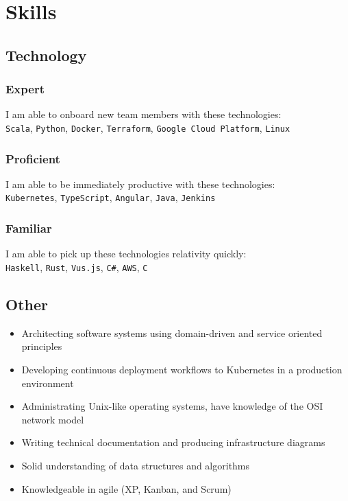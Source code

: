\documentclass[letterpaper,12pt,oneside]{article}
\begin{document}
\section*{Skills}
\subsection*{Technology}
\subsubsection*{Expert}
I am able to onboard new team members with these technologies:\\
\texttt{Scala}, \texttt{Python}, \texttt{Docker}, \texttt{Terraform}, \texttt{Google Cloud Platform}, \texttt{Linux}
\subsubsection*{Proficient}
I am able to be immediately productive with these technologies:\\
\texttt{Kubernetes}, \texttt{TypeScript}, \texttt{Angular}, \texttt{Java}, \texttt{Jenkins}
\subsubsection*{Familiar}
I am able to pick up these technologies relativity quickly:\\
\texttt{Haskell}, \texttt{Rust}, \texttt{Vus.js}, \texttt{C\#}, \texttt{AWS}, \texttt{C}
\subsection*{Other}
\begin{itemize}
      \setlength\itemsep{0em}
      \item Architecting software systems using domain-driven and service oriented principles
      \item Developing continuous deployment workflows to Kubernetes in a production environment
      \item Administrating Unix-like operating systems, have knowledge of the OSI network model
      \item Writing technical documentation and producing infrastructure diagrams
      \item Solid understanding of data structures and algorithms
      \item Knowledgeable in agile (XP, Kanban, and Scrum)
\end{itemize}
\end{document}
